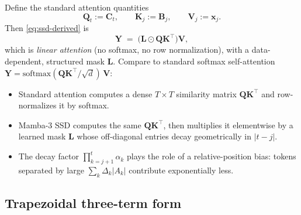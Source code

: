 \documentclass[11pt,a4paper]{article}
\begin{document}
Define the standard attention quantities
\begin{equation}
  \bm{Q}_t := \bm{C}_t,\qquad \bm{K}_j := \bm{B}_j,\qquad \bm{V}_j := \bm{x}_j.
\end{equation}
Then \eqref{eq:ssd-derived} is
\begin{equation}\label{eq:attn}
  \bm{Y} \;=\; \bigl(\bm{L}\odot \bm{Q}\bm{K}^\top\bigr)\bm{V},
\end{equation}
which is \emph{linear attention} (no softmax, no row normalization),
with a data-dependent, structured mask $\bm{L}$. Compare to standard
softmax self-attention
$\bm{Y} = \mathrm{softmax}(\bm{Q}\bm{K}^\top / \sqrt{d})\,\bm{V}$:
\begin{itemize}
  \item Standard attention computes a dense $T\times T$ similarity
        matrix $\bm{Q}\bm{K}^\top$ and row-normalizes it by softmax.
  \item Mamba-3 SSD computes the same $\bm{Q}\bm{K}^\top$, then
        multiplies it elementwise by a learned mask $\bm{L}$ whose
        off-diagonal entries decay geometrically in $|t-j|$.
  \item The decay factor $\prod_{k=j+1}^{t}\alpha_k$ plays the role of
        a relative-position bias: tokens separated by large
        $\sum_{k}\Delta_k |A_k|$ contribute exponentially less.
\end{itemize}

\subsection{Trapezoidal three-term form}\label{sec:trap}
\end{document}
